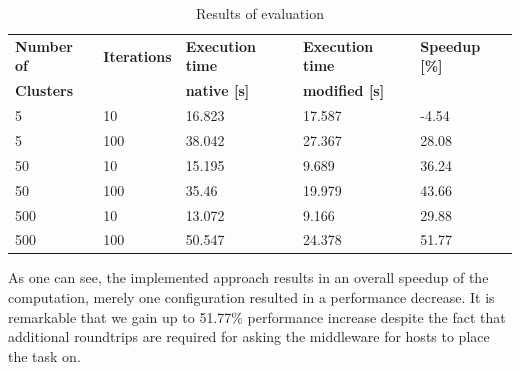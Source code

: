 \begin{table}[h]
    \centering
    \begin{tabular}{| l | l | l | l | l | }
        \hline
        \textbf{Number of} & \textbf{Iterations} & \textbf{Execution time}
            & \textbf{Execution time} & \textbf{Speedup [\%]} \\
        \textbf{Clusters} & & \textbf{native [s]} & \textbf{modified [s]} & \\ \hline

        5 & 10 & 16.823 & 17.587 & -4.54 \\ \hline
        5 & 100 & 38.042 & 27.367 & 28.08 \\ \hline
        50 &10 &15.195 &9.689 &36.24 \\ \hline
        50 &100 &35.46 &19.979 &43.66 \\ \hline
        500 &10 &13.072 &9.166 &29.88 \\ \hline
        500 &100 &50.547 &24.378 &51.77 \\ \hline
    \end{tabular}
    \caption{Results of evaluation}
    \label{table:results}
\end{table}

As one can see, the implemented approach results in an overall speedup of the computation, merely
one configuration resulted in a performance decrease. It is remarkable that we gain up to 51.77\%
performance increase despite the fact that additional roundtrips are required for asking the
middleware for hosts to place the task on.
